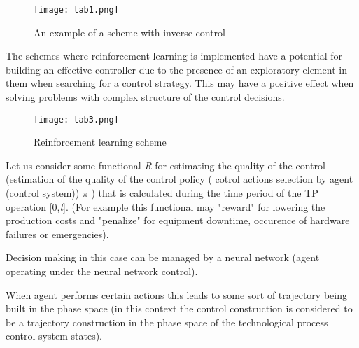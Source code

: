 \documentclass{article}
\begin{document}
\begin{minipage}[t]{0.45\textwidth}
\begin{figure}[H]
\centering
\begin{minipage}[t]{0.4\textwidth}
  \centering
  \hspace*{-2.4cm}\texttt{[image: tab1.png]}
  \captionsetup{justification=centering, font=small}
  \caption{An example of a scheme with inverse control}\label{fig:myfigure}
\end{minipage}
\end{figure}

    \vspace{0.4\baselineskip}\hspace{0.2cm} The schemes where reinforcement learning is implemented have a potential for building an effective controller due to the presence of an exploratory element in them when searching for a control strategy. This may have a positive effect when solving problems with complex structure of the control decisions.
\vspace{0.8\baselineskip}
\begin{figure}[H]
\centering
\begin{minipage}[t]{0.4\textwidth}
  \centering
  \hspace*{-2.4cm}\texttt{[image: tab3.png]}
  \captionsetup{justification=centering, font=small}
  \caption{Reinforcement learning scheme}\label{fig:myfigure}
\end{minipage}%
\end{figure}

    \vspace{0.4\baselineskip}\hspace{0.2cm} Let us consider some functional \textit{R} for estimating the quality of the control (estimation of the quality of the control policy ( cotrol actions selection by agent (control system)) $\pi$ ) that is calculated during the time period of the TP operation [0,\textit{t}]. (For example this functional may "reward" for lowering the production costs and "penalize" for equipment downtime, occurence of hardware failures or emergencies).

    \hspace{0.2cm} Decision making in this case can be managed by a neural network (agent operating under the neural network control).

    \hspace{0.2cm} When agent performs certain actions this leads to some sort of trajectory being built in the phase space (in this context the control construction is considered to be a trajectory construction in the phase space of the technological process control system states).


\end{minipage}
\end{document}
